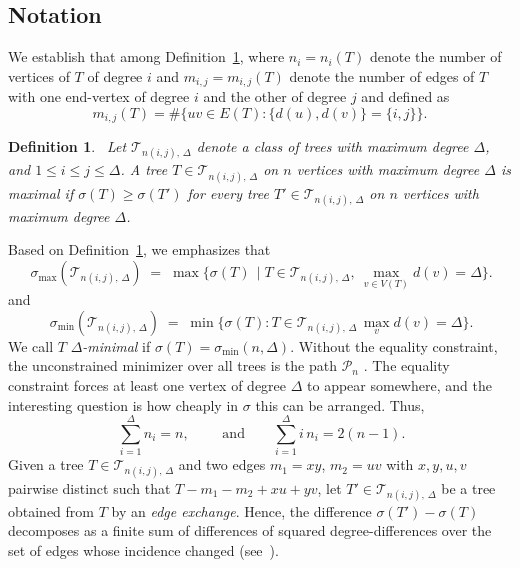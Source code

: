 \documentclass[12pt]{amsart}
\newtheorem{definition}{Definition}
\newcommand{\TT}{\mathcal{T}}
\begin{document}
\subsection{Notation} 
We establish that among Definition~\ref{deff01tree}, where
$n_i = n_i(T)$ denote the number of vertices of $T$ of degree $i$ and $m_{i,j}=m_{i,j}(T)$ denote the number of edges of
$T$ with one end-vertex of degree $i$ and the other of degree $j$ and defined as
\[
m_{i,j}(T)=\#\{uv\in E(T):\{d(u),d(v)\}=\{i,j\}\}.
\]
\begin{definition}~\label{deff01tree}
Let $\TT_{n(i,j),\,\Delta}$ denote a class of trees with maximum degree $\Delta$, and $1\leqslant i\leqslant j\leqslant \Delta$. A tree $T\in \TT_{n(i,j),\,\Delta}$ on
$n$ vertices with maximum degree $\Delta$ is maximal if
$\sigma(T)\ge \sigma(T')$ for every tree $T'\in \TT_{n(i,j),\,\Delta}$ on $n$ vertices with maximum degree $\Delta$.
\end{definition}
Based on Definition~\ref{deff01tree}, we emphasizes that 
\begin{equation}~\label{eqsigmamax01def}
\sigma_{\max}(\TT_{n(i,j),\,\Delta}) \;=\; \max\{\sigma(T)\, \mid T\in \TT_{n(i,j),\,\Delta},\ \textstyle\max_{v\in V(T)}d(v)=\Delta\}.
\end{equation}
and 
\begin{equation}~\label{eqq02sigmamindef}
\sigma_{\min}(\TT_{n(i,j),\,\Delta}) \;=\; \min\{\sigma(T): T\in \TT_{n(i,j),\,\Delta} \, \textstyle\max_v d(v)=\Delta\}.
\end{equation}
We call $T$ \emph{$\Delta$-minimal} if $\sigma(T)=\sigma_{\min}(n,\Delta)$.
Without the equality constraint, the unconstrained minimizer over all trees
is the path $\mathcal P_n$ \cite{AbdoEtAl2018}. The equality constraint forces at least one vertex of degree $\Delta$ to appear somewhere, and the interesting
question is how cheaply in $\sigma$ this can be arranged. 
Thus, 
\begin{equation}~\label{eqsigmamax02def}
\sum_{i=1}^{\Delta} n_i = n,\qquad \text{ and} \qquad \sum_{i=1}^{\Delta} i\, n_i = 2(n-1).
\end{equation}
Given a tree $T\in \TT_{n(i,j),\,\Delta}$ and two edges $m_1=xy$, $m_2=uv$ with $x,y,u,v$ pairwise distinct such that $T-m_1-m_2+xu+yv$, let $T'\in \TT_{n(i,j),\,\Delta}$ be  a tree obtained from $T$ by an \emph{edge exchange}. Hence, the difference $\sigma(T')-\sigma(T)$ decomposes
as a finite sum of differences of squared degree-differences over the  set of edges whose incidence changed (see~\cite{DimitrovPaper2025}). 
\end{document}
